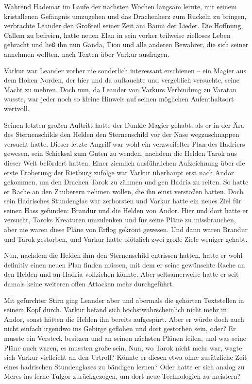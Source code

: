 Während Hademar im Laufe der nächsten Wochen langsam lernte, mit seinem kristallenen Gefängnis umzugehen und das Drachenherz zum Ruckeln zu bringen, verbrachte Leander den Großteil seiner Zeit am Baum der Lieder. Die Hoffnung, Callem zu befreien, hatte neuen Elan in sein vorher teilweise zielloses Leben gebracht und ließ ihn nun Gända, Tion und alle anderen Bewahrer, die sich seiner annehmen wollten, nach Texten über Varkur ausfragen.

Varkur war Leander vorher nie sonderlich interessant erschienen – ein Magier aus dem Hohen Norden, der hier und da auftauchte und vergeblich versuchte, seine Macht zu mehren. Doch nun, da Leander von Varkurs Verbindung zu Varatan wusste, war jeder noch so kleine Hinweis auf seinen möglichen Aufenthaltsort wertvoll.

Seinen letzten großen Auftritt hatte der Dunkle Magier gehabt, als er in der Ära des Sternenschilds den Helden den Sternenschild vor der Nase wegzuschnappen versucht hatte. Dieser letzte Angriff war wohl ein verzweifelter Plan des Hadriers gewesen, sein Schicksal zum Guten zu wenden, nachdem die Helden Tarok aus dieser Welt befördert hatten. Einer ziemlich ausführlichen Aufzeichnung über die erste Eroberung der Rietburg zufolge war Varkur überhaupt erst nach Andor gekommen, um den Drachen Tarok zu zähmen und gen Hadria zu reiten. So hatte er Rache an den Zauberern nehmen wollen, die ihn einst verstoßen hatten. Doch sein Hadrisches Stundenglas war zerborsten und Varkur hatte ein neues Ziel für seinen Hass gefunden: Brandur und die Helden von Andor. Hier und dort hatte er versucht, Taroks Kreaturen umzulenken und für seine Pläne zu missbrauchen, aber nie waren diese Pläne von Erflog gekrönt gewesen. Und dann waren Brandur und Tarok gestorben, und Varkur hatte plötzlich zwei große Ziele weniger gehabt.

Nun, nachdem die Helden ihm den Sternenschild entrissen hatten, hatte er wohl definitiv einen neuen Plan finden müssen, mit dem er seine gewünschte Rache an den Helden und an Hadria vollziehen könnte. Aber seltsamerweise hatte er seit damals keine weiteren offen Attacken mehr durchgeführt.

Mit gefurchter Stirn ging Leander aber und abermals die gehörten Textstellen in seinem Kopf durch. Varkur befand sich höchstwahrscheinlich nicht mehr in Andor, sonst hätten die Helden ihn bereits aufgespürt. Aber er würde doch auch nicht einfach irgendwo ins Gebirge geflohen und dort gestorben sein, oder? Er musste ein Versteck besitzen und an seinen nächsten Plänen feilen, und was seine Pläne auch waren, es mussten große sein. Nun, wo Tarok nicht mehr war, wagte sich Varkur vielleicht an den Urtroll? Könnte er diesen etwa ohne zusätzliche Zeit eines hadrischen Stundenglases zu bändigen lernen? Oder hatte er sich analog zu Meres ins ferne Tulgor zurückgezogen, um dort neue Technologien zu meistern?

